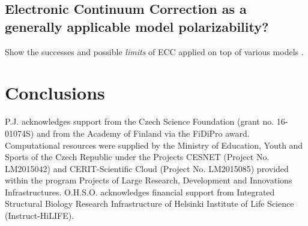 \documentclass[journal=jpcbfk,manuscript=article]{achemso}
\begin{document}
 

 
 
 

\subsection{Electronic Continuum Correction as a generally applicable model polarizability?}

Show the successes and possible \emph{limits} of ECC applied on top of various models \cite{melcr18, martinek17, Pluharova2014, kohagen14, kohagen16}. 


 
 
 
 
 
\section{Conclusions} 

 
 
 
\begin{acknowledgement} 
P.J. acknowledges support from the Czech Science Foundation (grant no. 16-01074S)  
and from the Academy of Finland via the FiDiPro award. 
Computational resources were supplied by the Ministry of Education, Youth and Sports 
of the Czech Republic under the Projects CESNET (Project No. LM2015042) and CERIT-Scientific 
Cloud (Project No. LM2015085) provided within the program Projects of Large Research, 
Development and Innovations Infrastructures. 
O.H.S.O. acknowledges financial support from 
Integrated Structural Biology Research Infrastructure of 
Helsinki Institute of Life Science (Instruct-HiLIFE). 
\end{acknowledgement} 
 
\end{document}
